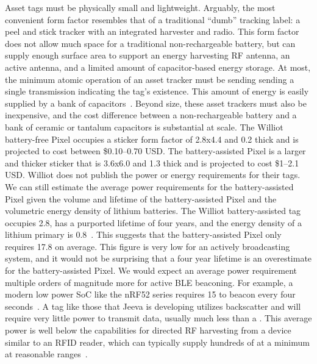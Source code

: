 Asset tags must be physically small and lightweight.
Arguably, the most convenient form factor resembles that of a traditional ``dumb'' tracking label: a peel and stick tracker with an integrated harvester and radio.
This form factor does not allow much space for a traditional non-rechargeable battery, but can supply enough surface area to support an energy harvesting RF antenna, an active antenna, and a limited amount of capacitor-based energy storage.
At most, the minimum atomic operation of an asset tracker must be sending
sending a single transmission indicating the tag's existence.
This amount of energy is easily supplied by a bank of capacitors~\cite{debruin2013monjolo, campbellEnergy14, yervaGrafting12}.
Beyond size, these asset trackers must also be inexpensive, and the cost difference between a non-rechargeable battery and a bank of ceramic or tantalum capacitors is substantial at scale.
The Williot battery-free Pixel occupies a sticker form factor of 2.8x4.4\ssi{\centi\meter} and 0.2\ssi{\milli\meter} thick and is projected to cost between \$0.10--0.70 USD.
The battery-assisted Pixel is a larger and thicker sticker that is 3.6x6.0\ssi{\centi\meter} and 1.3\ssi{\milli\meter} thick and is projected to cost \$1--2.1 USD.
Williot does not publish the power or energy requirements for their tags.
We can still estimate the average power requirements for the battery-assisted Pixel
given the volume and lifetime of the battery-assisted Pixel and the volumetric energy density of lithium batteries.
The Williot battery-assisted tag occupies 2.8\ssi{\centi\meter\cubed}, has a purported lifetime of four years, and the energy density of a lithium primary is 0.8\ssi[per-mode=symbol]{\Wh\per\centi\meter\cubed}~\cite{tuna2016energy}.
This suggests that the battery-assisted Pixel only requires 17.8\ssi{\nano\watt} on average.
This figure is very low for an actively broadcasting system, and it would not be surprising that a four year lifetime is an overestimate for the battery-assisted Pixel.
We would expect an average power requirement multiple orders of magnitude more for active BLE beaconing. For example, a modern low power SoC like the nRF52 series requires 15\ssi{\micro\watt} to beacon every four seconds~\cite{nrf52Power}.
A tag like those that Jeeva is developing utilizes backscatter and will require very little power to transmit data, usually much less than a \ssi{\micro\watt}. 
This average power is well below the capabilities for directed RF harvesting from a device similar to an RFID reader, which can typically supply hundreds of \ssi{\micro\watt} at a minimum at reasonable ranges~\cite{sample2008design}.

